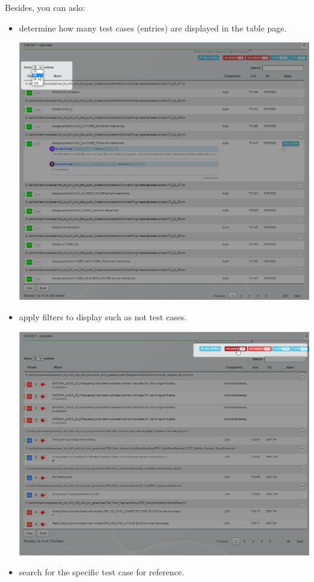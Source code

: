 Besides, you can aslo:
\begin{itemize}
   \item determine how many test cases (entries) are displayed in the table page.

         \includegraphics[width=0.9\linewidth]
         {./pictures/datatable/change_number_entries.png}
         
   \item apply filters to display such as not  test cases.
   
         \includegraphics[width=0.9\linewidth]
         {./pictures/datatable/apply_filter.png}

   \item search for the specific test case for reference.
   

\end{itemize}
